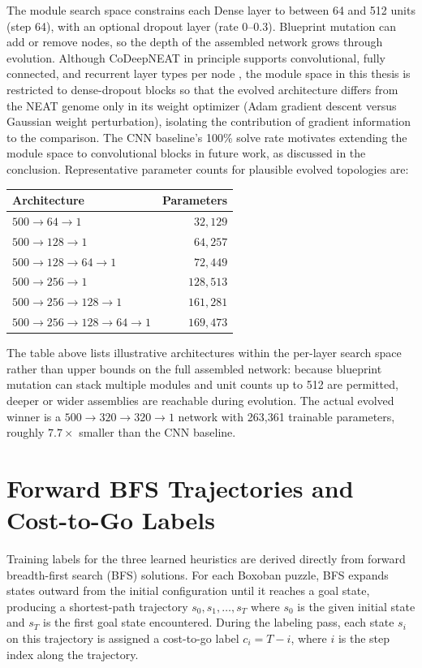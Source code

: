 The module search space constrains each Dense layer to between 64 and 512 units (step 64), with an optional dropout layer (rate 0--0.3). Blueprint mutation can add or remove nodes, so the depth of the assembled network grows through evolution. Although CoDeepNEAT in principle supports convolutional, fully connected, and recurrent layer types per node \cite{miikkulainen2019evolving}, the module space in this thesis is restricted to dense-dropout blocks so that the evolved architecture differs from the NEAT genome only in its weight optimizer (Adam gradient descent versus Gaussian weight perturbation), isolating the contribution of gradient information to the comparison. The CNN baseline's 100\% solve rate motivates extending the module space to convolutional blocks in future work, as discussed in the conclusion. Representative parameter counts for plausible evolved topologies are:

\begin{center}
\begin{tabular}{lr}
\toprule
Architecture & Parameters \\
\midrule
$500 \to 64 \to 1$            & $32{,}129$ \\
$500 \to 128 \to 1$           & $64{,}257$ \\
$500 \to 128 \to 64 \to 1$    & $72{,}449$ \\
$500 \to 256 \to 1$           & $128{,}513$ \\
$500 \to 256 \to 128 \to 1$   & $161{,}281$ \\
$500 \to 256 \to 128 \to 64 \to 1$ & $169{,}473$ \\
\bottomrule
\end{tabular}
\end{center}

The table above lists illustrative architectures within the per-layer search space rather than upper bounds on the full assembled network: because blueprint mutation can stack multiple modules and unit counts up to 512 are permitted, deeper or wider assemblies are reachable during evolution. The actual evolved winner is a $500 \to 320 \to 320 \to 1$ network with 263{,}361 trainable parameters, roughly $7.7\times$ smaller than the CNN baseline.

\section{Forward BFS Trajectories and Cost-to-Go Labels}

Training labels for the three learned heuristics are derived directly from forward breadth-first search (BFS) solutions. For each Boxoban puzzle, BFS expands states outward from the initial configuration until it reaches a goal state, producing a shortest-path trajectory $s_0, s_1, \dots, s_T$ where $s_0$ is the given initial state and $s_T$ is the first goal state encountered. During the labeling pass, each state $s_i$ on this trajectory is assigned a cost-to-go label $c_i = T - i$, where $i$ is the step index along the trajectory.

